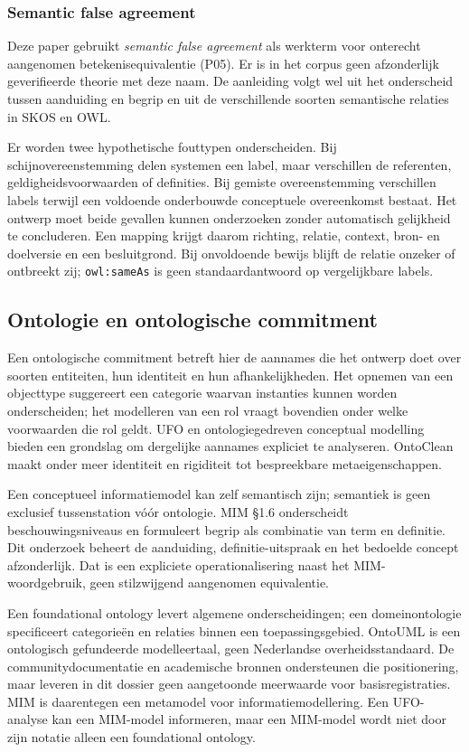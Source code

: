 \subsubsection{Semantic false agreement}
Deze paper gebruikt \emph{semantic false agreement} als werkterm voor onterecht aangenomen betekenisequivalentie (P05). Er is in het corpus geen afzonderlijk geverifieerde theorie met deze naam. De aanleiding volgt wel uit het onderscheid tussen aanduiding en begrip en uit de verschillende soorten semantische relaties in SKOS en OWL. \citep{S11,S31,S30}

Er worden twee hypothetische fouttypen onderscheiden. Bij schijnovereenstemming delen systemen een label, maar verschillen de referenten, geldigheidsvoorwaarden of definities. Bij gemiste overeenstemming verschillen labels terwijl een voldoende onderbouwde conceptuele overeenkomst bestaat. Het ontwerp moet beide gevallen kunnen onderzoeken zonder automatisch gelijkheid te concluderen. Een mapping krijgt daarom richting, relatie, context, bron- en doelversie en een besluitgrond. Bij onvoldoende bewijs blijft de relatie onzeker of ontbreekt zij; \texttt{owl:sameAs} is geen standaardantwoord op vergelijkbare labels.

\subsection{Ontologie en ontologische commitment}
Een ontologische commitment betreft hier de aannames die het ontwerp doet over soorten entiteiten, hun identiteit en hun afhankelijkheden. Het opnemen van een objecttype suggereert een categorie waarvan instanties kunnen worden onderscheiden; het modelleren van een rol vraagt bovendien onder welke voorwaarden die rol geldt. UFO en ontologiegedreven conceptual modelling bieden een grondslag om dergelijke aannames expliciet te analyseren. OntoClean maakt onder meer identiteit en rigiditeit tot bespreekbare metaeigenschappen. \citep{L08,L09,L10}

Een conceptueel informatiemodel kan zelf semantisch zijn; semantiek is geen exclusief tussenstation vóór ontologie. MIM §1.6 onderscheidt beschouwingsniveaus en formuleert begrip als combinatie van term en definitie. Dit onderzoek beheert de aanduiding, definitie-uitspraak en het bedoelde concept afzonderlijk. Dat is een expliciete operationalisering naast het MIM-woordgebruik, geen stilzwijgend aangenomen equivalentie. \citep{S13}

Een foundational ontology levert algemene onderscheidingen; een domeinontologie specificeert categorieën en relaties binnen een toepassingsgebied. OntoUML is een ontologisch gefundeerde modelleertaal, geen Nederlandse overheidsstandaard. De communitydocumentatie en academische bronnen ondersteunen die positionering, maar leveren in dit dossier geen aangetoonde meerwaarde voor basisregistraties. \citep{S40,S41,L08,L09} MIM is daarentegen een metamodel voor informatiemodellering. Een UFO-analyse kan een MIM-model informeren, maar een MIM-model wordt niet door zijn notatie alleen een foundational ontology. \citep{S13}

